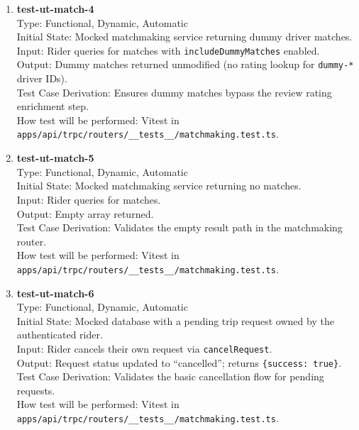 \documentclass[12pt, titlepage]{article}
\begin{document}
\begin{enumerate}
\item \textbf{test-ut-match-4}\\
Type: Functional, Dynamic, Automatic\\
Initial State: Mocked matchmaking service returning dummy driver matches.\\
Input: Rider queries for matches with \texttt{includeDummyMatches} enabled.\\
Output: Dummy matches returned unmodified (no rating lookup for \texttt{dummy-*} driver IDs).\\
Test Case Derivation: Ensures dummy matches bypass the review rating enrichment step.\\
How test will be performed: Vitest in \texttt{apps/api/trpc/routers/\_\_tests\_\_/matchmaking.test.ts}.\\

\item \textbf{test-ut-match-5}\\
Type: Functional, Dynamic, Automatic\\
Initial State: Mocked matchmaking service returning no matches.\\
Input: Rider queries for matches.\\
Output: Empty array returned.\\
Test Case Derivation: Validates the empty result path in the matchmaking router.\\
How test will be performed: Vitest in \texttt{apps/api/trpc/routers/\_\_tests\_\_/matchmaking.test.ts}.\\

\item \textbf{test-ut-match-6}\\
Type: Functional, Dynamic, Automatic\\
Initial State: Mocked database with a pending trip request owned by the authenticated rider.\\
Input: Rider cancels their own request via \texttt{cancelRequest}.\\
Output: Request status updated to ``cancelled''; returns \texttt{\{success: true\}}.\\
Test Case Derivation: Validates the basic cancellation flow for pending requests.\\
How test will be performed: Vitest in \texttt{apps/api/trpc/routers/\_\_tests\_\_/matchmaking.test.ts}.\\


\end{enumerate}
\end{document}

